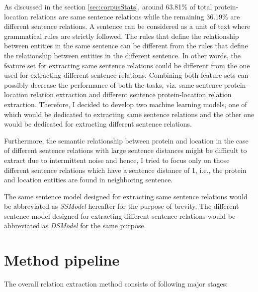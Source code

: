 As discussed in the section \ref{sec:corpusStats}, around 63.81\% of total protein-location relations are same sentence relations while the remaining 36.19\% are different sentence relations. A sentence can be considered as a unit of text where grammatical rules are strictly followed. The rules that define the relationship between entities in the same sentence can be different from the rules that define the relationship between entities in the different sentence. In other words, the feature set for extracting same sentence relations could be different from the one used for extracting different sentence relations. Combining both feature sets can possibly decrease the performance of both the tasks, viz. same sentence protein-location relation extraction and different sentence protein-location relation extraction. Therefore, I decided to develop two machine learning models, one of which would be dedicated to extracting same sentence relations and the other one would be dedicated for extracting different sentence relations.

Furthermore, the semantic relationship between protein and location in the case of different sentence relations with large sentence distances might be difficult to extract due to intermittent noise and hence, I tried to focus only on those different sentence relations which have a sentence distance of 1, i.e., the protein and location entities are found in neighboring sentence.

The same sentence model designed for extracting same sentence relations would be  abbreviated as \textit{SSModel} hereafter for the purpose of brevity. The different sentence model designed for extracting different sentence relations would be abbreviated as \textit{DSModel} for the same purpose.

\section{Method pipeline}\label{sec:pipeline}


The overall relation extraction method consists of following major stages:

